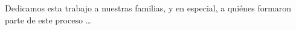 \begin{dedicatoria} 

Dedicamos esta trabajo a nuestras familias, y en especial, a quiénes formaron parte de este proceso \dots

\end{dedicatoria}